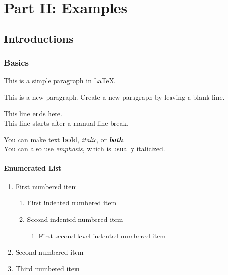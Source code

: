 \documentclass[
12pt, %
a4paper, %
fleqn,   %
]{notes}
\begin{document}


\part{Part II: Examples}


\chapterspaceabove{6.75cm}
\chapterspacebelow{7.25cm}
\chapter{Introductions}


\section{Basics}
This is a simple paragraph in LaTeX.

This is a new paragraph. Create a new paragraph by leaving a blank line.

This line ends here.\\
This line starts after a manual line break.

You can make text \textbf{bold}, \textit{italic}, or \textbf{\textit{both}}. \\
\noindent
You can also use \emph{emphasis}, which is usually italicized.


\subsection{Enumerated List}
\begin{enumerate}
    \item First numbered item
        \begin{enumerate}
            \item First indented numbered item
            \item Second indented numbered item
                \begin{enumerate}
                    \item First second-level indented numbered item
                \end{enumerate}
        \end{enumerate}
    \item Second numbered item
    \item Third numbered item
\end{enumerate}
\end{document}
